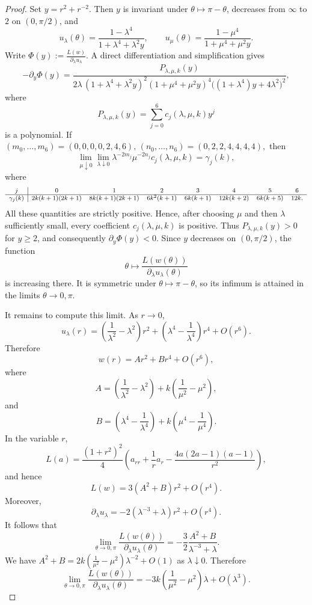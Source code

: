 \documentclass[11pt,a4paper]{article}
\numberwithin{equation}{section}
\theoremstyle{plain}
\theoremstyle{remark}
\begin{document}
\begin{proof}
Set $y=r^2+r^{-2}$. Then $y$ is invariant under $\theta\mapsto\pi-\theta$, decreases from
$\infty$ to $2$ on $(0,\pi/2)$, and
$$
u_\lambda(\theta)
=
\frac{1-\lambda^4}{1+\lambda^4+\lambda^2y},
\qquad
u_\mu(\theta)
=
\frac{1-\mu^4}{1+\mu^4+\mu^2y}.
$$
Write $\Phi(y):=\frac{L(w)}{\partial_\lambda u_\lambda}$. A direct differentiation and simplification gives
$$
-\partial_y\Phi(y)
=
\frac{P_{\lambda,\mu,k}(y)}
{2\lambda\,
 (1+\lambda^4+\lambda^2y)^2
 (1+\mu^4+\mu^2y)^4
 \bigl((1+\lambda^4)y+4\lambda^2\bigr)^2},
$$
where
$$
P_{\lambda,\mu,k}(y)=\sum_{j=0}^{6}c_j(\lambda,\mu,k)y^j
$$
is a polynomial. If $(m_0,\ldots,m_6)=(0,0,0,0,2,4,6),
\,
(n_0,\ldots,n_6)=(0,2,2,4,4,4,4),$ then
$$
\lim_{\mu\downarrow0}\lim_{\lambda\downarrow0}
\lambda^{-2m_j}\mu^{-2n_j}c_j(\lambda,\mu,k)
=
\gamma_j(k),
$$
where
$$
\footnotesize
\begin{array}{c|ccccccc}
j
&0&1&2&3&4&5&6\\ \hline
\gamma_j(k)
&2k(k+1)(2k+1)
&8k(k+1)(2k+1)
&6k^2(k+1)
&6k(k+1)
&12k(k+2)
&6k(k+5)
&12k .
\end{array}
$$
All these quantities are strictly positive. Hence, after choosing $\mu$
and then $\lambda$ sufficiently small, every coefficient $c_j(\lambda,\mu,k)$ is
positive. Thus $P_{\lambda,\mu,k}(y)>0$ for $y\geq2$, and consequently $\partial_y\Phi(y)<0$. Since $y$ decreases on $(0,\pi/2)$, the function
$$
\theta\longmapsto
\frac{L(w(\theta))}{\partial_\lambda u_\lambda(\theta)}
$$
is increasing there. It is symmetric under
$\theta\mapsto\pi-\theta$, so its infimum is attained in the limits
$\theta\to0,\pi$.

It remains to compute this limit. As $r\to0$,
$$
u_\lambda(r)
=
\left(\frac1{\lambda^2}-\lambda^2\right)r^2
+
\left(\lambda^4-\frac1{\lambda^4}\right)r^4
+
O(r^6).
$$
Therefore
$$
w(r)=Ar^2+Br^4+O(r^6),
$$
where
$$
A=
\left(\frac1{\lambda^2}-\lambda^2\right)
+
k\left(\frac1{\mu^2}-\mu^2\right),
$$
and
$$
B=
\left(\lambda^4-\frac1{\lambda^4}\right)
+
k\left(\mu^4-\frac1{\mu^4}\right).
$$
In the variable $r$,
$$
L(a)
=
\frac{(1+r^2)^2}{4}
\left(
a_{rr}+\frac1r a_r
-\frac{4a(2a-1)(a-1)}{r^2}
\right),
$$
and hence
$$
L(w)=3(A^2+B)r^2+O(r^4).
$$
Moreover,
$$
\partial_\lambda u_\lambda
=
-2\left(\lambda^{-3}+\lambda\right)r^2+O(r^4).
$$
It follows that
$$
\lim_{\theta\to0,\pi}
\frac{L(w(\theta))}{\partial_\lambda u_\lambda(\theta)}
=
-\frac32
\frac{A^2+B}{\lambda^{-3}+\lambda}.
$$
We have $A^2+B=2k\left(\frac1{\mu^2}-\mu^2\right)\lambda^{-2}+O(1)$ as $\lambda\downarrow0$. Therefore
$$
\lim_{\theta\to0,\pi}
\frac{L(w(\theta))}{\partial_\lambda u_\lambda(\theta)}
=
-3k\left(\frac1{\mu^2}-\mu^2\right)\lambda
+O(\lambda^3).
$$
\end{proof}
\end{document}
